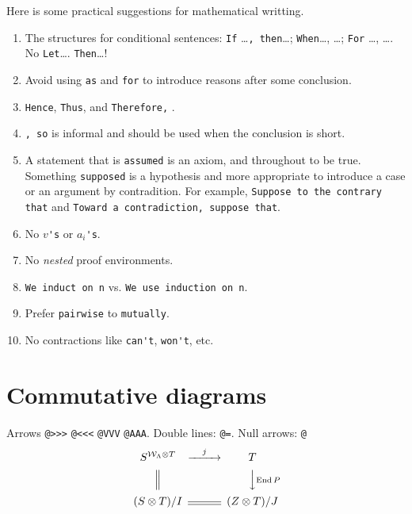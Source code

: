 \documentclass[12pt]{amsart}
\theoremstyle{plain}
\theoremstyle{definition}
\theoremstyle{remark}
\numberwithin{equation}{section} %
\begin{document}
Here is some practical suggestions for mathematical writting.
\begin{enumerate}
	\item The structures for conditional sentences: \verb|If| \ldots\verb|, then|\ldots; \verb|When|\ldots, \ldots; \verb|For| \ldots, \ldots. No \verb|Let|\ldots. \verb|Then|\ldots!

	\item Avoid using \verb|as| and \verb|for| to introduce reasons after some conclusion.

	\item \verb|Hence|, \verb|Thus|, and \verb|Therefore,| .

	\item \verb|, so| is informal and should be used when the conclusion is short.

	\item A statement that is \verb|assumed| is an axiom, and throughout to be true. Something \verb|supposed| is a hypothesis and more appropriate to introduce a case or an argument by contradition. For example, \verb|Suppose to the contrary that| and \verb|Toward a contradiction, suppose that|.

	\item No $ v $\verb|'s| or $ a_{i} $\verb|'s|.

	\item No \textit{nested} proof environments.

	\item \verb|We induct on n| vs. \verb|We use induction on n|.

	\item Prefer \verb|pairwise| to \verb|mutually|.

	\item No contractions like \verb|can't|, \verb|won't|, etc.

\end{enumerate}

\section{Commutative diagrams}

Arrows \verb|@>>>| \verb|@<<<| \verb|@VVV| \verb|@AAA|. Double lines: \verb|@=|. Null arrows: \verb|@|
\begin{equation}\label{key}
	\begin{CD}
		S^{{\mathcal{W}}_{\Lambda}\otimes T} @>j>> T\\
		@|  @VV{\operatorname{End} P}V\\
		(S\otimes T)/I  @= (Z\otimes T)/J
	\end{CD}
\end{equation}
\end{document}

